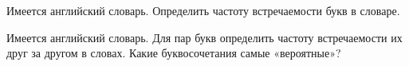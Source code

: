 
Имеется английский словарь. Определить частоту встречаемости букв в словаре.


Имеется английский словарь. Для пар букв определить частоту встречаемости их
друг за другом в словах. Какие буквосочетания самые «вероятные»?

